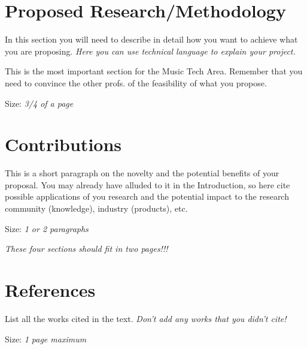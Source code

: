 \documentclass[11pt]{article}
\begin{document}
\section*{Proposed Research/Methodology}

In this section you will need to describe in detail how you want to achieve what you are proposing. \emph{Here you can use technical language to explain your project.} 

This is the most important section for the Music Tech Area. Remember that you need to convince the other profs. of the feasibility of what you propose.


Size: \emph{3/4 of a page}

\section*{Contributions}

This is a short paragraph on the novelty and the potential benefits of your proposal. You may already have alluded to it in the Introduction, so here cite possible applications of you research and the potential impact to the research community (knowledge), industry (products), etc.

Size: \emph{1 or 2 paragraphs}

\emph{These four sections should fit in two pages!!!}

\section*{References}

List all the works cited in the text. \emph{Don't add any works that you didn't cite!}

Size: \emph{1 page maximum}

\clearpage


\nocite{*}

\end{document}
